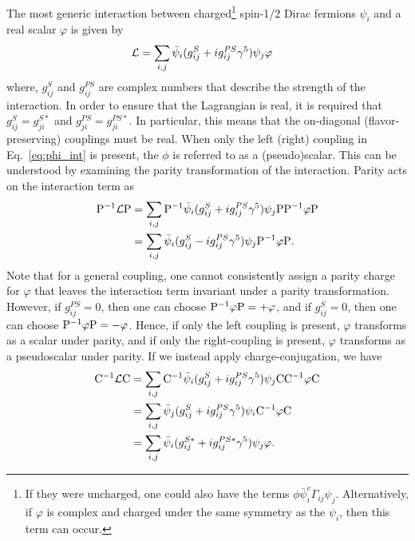 The most generic interaction between charged\footnote{If they were uncharged, one could also have the terms $\phi\bar{\psi}_i^c \Gamma_{ij}\psi_j$. Alternatively, if $\varphi$ is complex and charged under the same symmetry as the $\psi_i$, then this term can occur.} spin-1/2 Dirac fermions $\psi_i$ and a real scalar $\varphi$ is given by
\begin{align}
    {\cal L} &= \sum_{i,j}\bar{\psi}_i(g_{ij}^{S} + ig_{ij}^{PS}\gamma^5)\psi_j \varphi \label{eq:phi_int}
\end{align}
where, $g_{ij}^S$ and $g_{ij}^{PS}$ are complex numbers that describe the strength of the interaction. In order to ensure that the Lagrangian is real, it is required that $g_{ij}^S = g_{ji}^{S*}$ and $g_{ji}^{PS} = g_{ji}^{PS*}$. In particular, this means that the on-diagonal (flavor-preserving) couplings must be real. When only the left (right) coupling in Eq.~\ref{eq:phi_int} is present, the $\phi$ is referred to as a (pseudo)scalar. This can be understood by examining the parity transformation of the interaction. Parity acts on the interaction term as
\begin{align}
    {\rm P}^{-1}{\cal L}{\rm P} &= \sum_{i,j}{\rm P}^{-1}\bar{\psi}_i(g_{ij}^{S} + ig_{ij}^{PS}\gamma^5)\psi_j {\rm P}{\rm P}^{-1}\varphi{\rm P} \nonumber\\
    &= \sum_{i,j}\bar{\psi}_i(g_{ij}^{S} - ig_{ij}^{PS}\gamma^5)\psi_j {\rm P}^{-1}\varphi{\rm P}.
\end{align}
Note that for a general coupling, one cannot consistently assign a parity charge for $\varphi$ that leaves the interaction term invariant under a parity transformation. However, if $g_{ij}^{PS} = 0$, then one can choose ${\rm P}^{-1}\varphi {\rm P} = +\varphi$, and if $g_{ij}^{S} = 0$, then one can choose ${\rm P}^{-1}\varphi {\rm P} = -\varphi$. Hence, if only the left coupling is present, $\varphi$ transforms as a scalar under parity, and if only the right-coupling is present, $\varphi$ transforms as a pseudoscalar under parity. If we instead apply charge-conjugation, we have
\begin{align}
    {\rm C}^{-1}{\cal L}{\rm C} &= \sum_{i,j}{\rm C}^{-1}\bar{\psi}_i(g_{ij}^{S} + ig_{ij}^{PS}\gamma^5)\psi_j {\rm C}{\rm C}^{-1}\varphi{\rm C} \nonumber\\
    &= \sum_{i,j}\bar{\psi}_j(g_{ij}^{S} + ig_{ij}^{PS}\gamma^5)\psi_i {\rm C}^{-1}\varphi{\rm C} \nonumber\\
    &= \sum_{i,j}\bar{\psi}_i(g_{ij}^{S*} + ig_{ij}^{PS*}\gamma^5)\psi_j \varphi.
\end{align}

